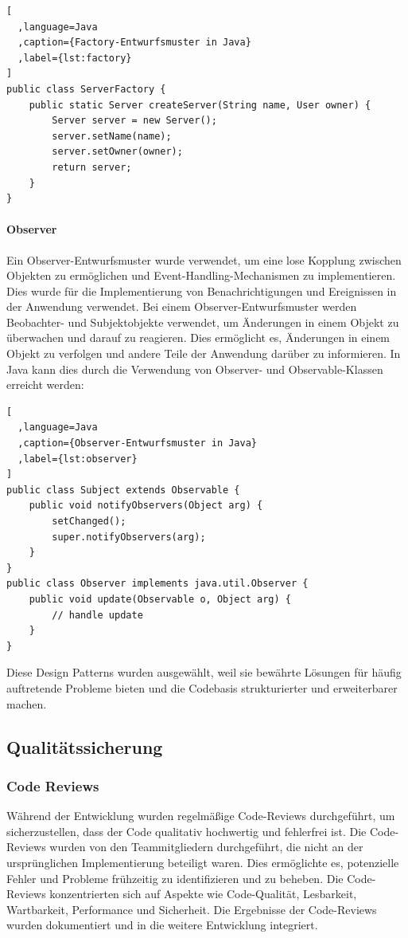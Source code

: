 \begin{lstlisting}[
  ,language=Java
  ,caption={Factory-Entwurfsmuster in Java}
  ,label={lst:factory}
]
public class ServerFactory {
    public static Server createServer(String name, User owner) {
        Server server = new Server();
        server.setName(name);
        server.setOwner(owner);
        return server;
    }
}
\end{lstlisting}

\paragraph{Observer}\label{observer} Ein Observer-Entwurfsmuster wurde verwendet, um eine lose Kopplung zwischen Objekten zu ermöglichen und Event-Handling-Mechanismen zu implementieren. Dies wurde für die Implementierung von Benachrichtigungen und Ereignissen in der Anwendung verwendet. Bei einem Observer-Entwurfsmuster werden Beobachter- und Subjektobjekte verwendet, um Änderungen in einem Objekt zu überwachen und darauf zu reagieren. Dies ermöglicht es, Änderungen in einem Objekt zu verfolgen und andere Teile der Anwendung darüber zu informieren. In Java kann dies durch die Verwendung von Observer- und Observable-Klassen erreicht werden:


\begin{lstlisting}[
  ,language=Java
  ,caption={Observer-Entwurfsmuster in Java}
  ,label={lst:observer}
]
public class Subject extends Observable {
    public void notifyObservers(Object arg) {
        setChanged();
        super.notifyObservers(arg);
    }
}
public class Observer implements java.util.Observer {
    public void update(Observable o, Object arg) {
        // handle update
    }
}
\end{lstlisting}

Diese Design Patterns wurden ausgewählt, weil sie bewährte Lösungen für häufig auftretende Probleme bieten und die Codebasis strukturierter und erweiterbarer machen.

\subsection{Qualitätssicherung}\label{qualituxe4tssicherung}

\subsubsection{Code Reviews}\label{code-reviews}

Während der Entwicklung wurden regelmäßige Code-Reviews durchgeführt, um sicherzustellen, dass der Code qualitativ hochwertig und fehlerfrei ist. Die Code-Reviews wurden von den Teammitgliedern durchgeführt, die nicht an der ursprünglichen Implementierung beteiligt waren. Dies ermöglichte es, potenzielle Fehler und Probleme frühzeitig zu identifizieren und zu beheben. Die Code-Reviews konzentrierten sich auf Aspekte wie Code-Qualität, Lesbarkeit, Wartbarkeit, Performance und Sicherheit. Die Ergebnisse der Code-Reviews wurden dokumentiert und in die weitere Entwicklung integriert.

